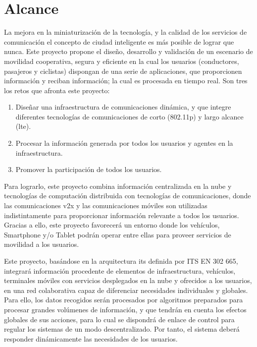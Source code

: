 \chapter{Alcance}\label{cha:alcance}
La mejora en la miniaturización de la tecnología, y la calidad de los servicios de comunicación el concepto
de ciudad inteligente es más posible de lograr que nunca. Este proyecto propone el diseño, desarrollo y
validación de un escenario de movilidad cooperativa, segura y eficiente en la cual los usuarios (conductores,
pasajeros y ciclistas) dispongan de una serie de aplicaciones, que proporcionen información y reciban
información; la cual es procesada en tiempo real. Son tres los retos que afronta este proyecto:

\begin{enumerate}
	\item Diseñar una infraestructura de comunicaciones dinámica, y que integre diferentes tecnologías de
	comunicaciones de corto (\gls{802.11p}) y largo alcance (\gls{lte}).

	\item Procesar la información generada por todos los usuarios y agentes en la infraestructura.

	\item Promover la participación de todos los usuarios.

\end{enumerate}
Para lograrlo, este proyecto combina información centralizada en la nube y tecnologías de computación
distribuida con tecnologías de comunicaciones, donde las comunicaciones \gls{v2x} y las comunicaciones
móviles son utilizadas indistintamente para proporcionar información relevante a todos los usuarios.
Gracias a ello, este proyecto favorecerá un entorno donde los vehículos, Smartphone y/o Tablet podrán
operar entre ellas para proveer servicios de movilidad a los usuarios.

Este proyecto, basándose en la arquitectura \gls{its} definida por ITS EN 302 665, integrará información
procedente de elementos de infraestructura, vehículos, terminales móviles con servicios desplegados en
la nube y ofrecidos a los usuarios, en una red colaborativa capaz de diferenciar necesidades individuales
y globales. Para ello, los datos recogidos serán procesados por algoritmos preparados para procesar grandes
volúmenes de información, y que tendrán en cuenta los efectos globales de sus acciones, para lo cual se
dispondrá de enlace de control para regular los sistemas de un modo descentralizado. Por tanto, el sistema
deberá responder dinámicamente las necesidades de los usuarios.

